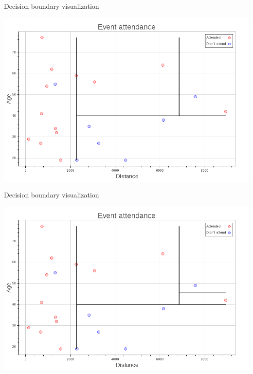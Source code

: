 \begin{frame}[fragile]{Decision boundary visualization}
    \begin{center}
        \includegraphics[scale=.25]{images/decision_tree_plot_3}
    \end{center}
\end{frame}

\begin{frame}[fragile]{Decision boundary visualization}
    \begin{center}
        \includegraphics[scale=.25]{images/decision_tree_plot_4}
    \end{center}
\end{frame}

